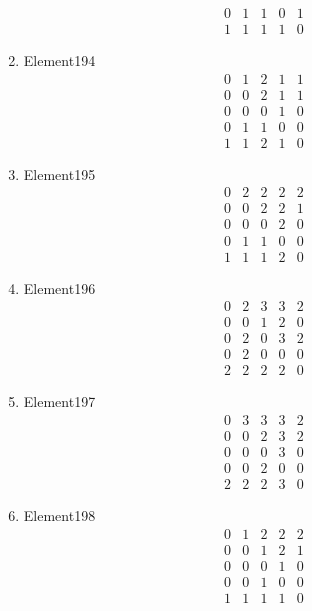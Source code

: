 \documentclass[12pt]{article}
\begin{document}
\begin{multicols}{3}
\begin{enumerate}
\begin{equation*}
\begin{array}{ccccc}
0&1&1&0&1\\
1&1&1&1&0
\end{array}
\end{equation*}
\item Element194
\begin{equation*}
\begin{array}{ccccc}
0&1&2&1&1\\
0&0&2&1&1\\
0&0&0&1&0\\
0&1&1&0&0\\
1&1&2&1&0
\end{array}
\end{equation*}
\item Element195
\begin{equation*}
\begin{array}{ccccc}
0&2&2&2&2\\
0&0&2&2&1\\
0&0&0&2&0\\
0&1&1&0&0\\
1&1&1&2&0
\end{array}
\end{equation*}
\item Element196
\begin{equation*}
\begin{array}{ccccc}
0&2&3&3&2\\
0&0&1&2&0\\
0&2&0&3&2\\
0&2&0&0&0\\
2&2&2&2&0
\end{array}
\end{equation*}
\item Element197
\begin{equation*}
\begin{array}{ccccc}
0&3&3&3&2\\
0&0&2&3&2\\
0&0&0&3&0\\
0&0&2&0&0\\
2&2&2&3&0
\end{array}
\end{equation*}
\item Element198
\begin{equation*}
\begin{array}{ccccc}
0&1&2&2&2\\
0&0&1&2&1\\
0&0&0&1&0\\
0&0&1&0&0\\
1&1&1&1&0
\end{array}

\end{equation*}
\end{enumerate}
\end{multicols}
\end{document}
